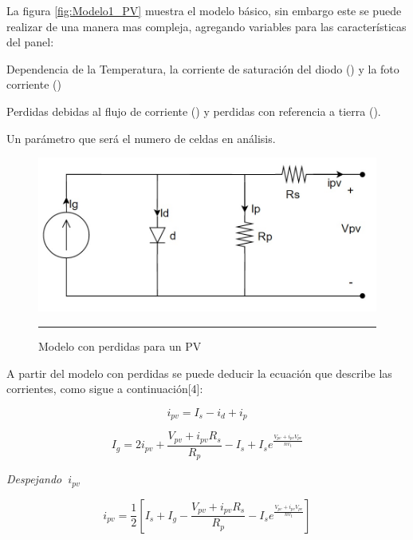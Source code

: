 La figura \ref{fig:Modelo1_PV} muestra el modelo básico, sin embargo este se puede realizar de una manera mas compleja, agregando variables para las características del panel: 

\begin{compactitem}

\item Dependencia de la Temperatura, la corriente de saturación del diodo () y la foto corriente ()


\item Perdidas debidas al flujo de corriente () y perdidas con referencia a tierra ().

\item  Un parámetro  que será el numero de celdas en análisis. 

\end{compactitem}

\begin{figure}[H]
  \centering
    \includegraphics[scale=0.5]{./M2PV.jpg}
    \rule{35em}{0.5pt}
  \caption[Modelo con perdidas para un PV]{ Modelo con perdidas para un PV}
  \label{fig:Modelo2_PV}
\end{figure}

A partir del modelo con perdidas se puede deducir la ecuación que describe las corrientes, como sigue a continuación[4]:

\begin{equation} \label{eq:ej1}
  i_{pv}
  = I_{s} - i_{d} + i_{p}
\end{equation}

\begin{equation} \label{eq:ej2}
  I_{g}
  =
  2i_{pv} + \frac{V_{pv}+i_{pv}R_{s}}{R_p} -  I_{s} + I_{s}e^{ \frac{V_{pv}+i_{pv}V_{pv}}{n v_t}} 
\end{equation}

\textsl{Despejando $\ i_{pv}$}

\begin{equation} \label{eq:ej3}
  i_{pv} 
  =
  \frac{1}{2} \left[I_{s} + I_{g} - \frac{V_{pv}+i_{pv}R_{s}}{R_p} - I_{s}e^{ \frac{V_{pv}+i_{pv}V_{pv}}{n v_t}} \right]
\end{equation}
  

